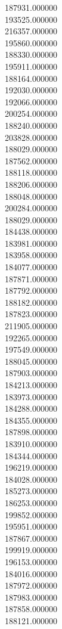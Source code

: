 187931.000000\\
193525.000000\\
216357.000000\\
195860.000000\\
188330.000000\\
195911.000000\\
188164.000000\\
192030.000000\\
192066.000000\\
200254.000000\\
188240.000000\\
203828.000000\\
188029.000000\\
187562.000000\\
188118.000000\\
188206.000000\\
188048.000000\\
200284.000000\\
188029.000000\\
184438.000000\\
183981.000000\\
183958.000000\\
184077.000000\\
187871.000000\\
187792.000000\\
188182.000000\\
187823.000000\\
211905.000000\\
192265.000000\\
197549.000000\\
188045.000000\\
187903.000000\\
184213.000000\\
183973.000000\\
184288.000000\\
184355.000000\\
187898.000000\\
183910.000000\\
184344.000000\\
196219.000000\\
184028.000000\\
185273.000000\\
186253.000000\\
199852.000000\\
195951.000000\\
187867.000000\\
199919.000000\\
196153.000000\\
184016.000000\\
187972.000000\\
187983.000000\\
187858.000000\\
188121.000000\\
